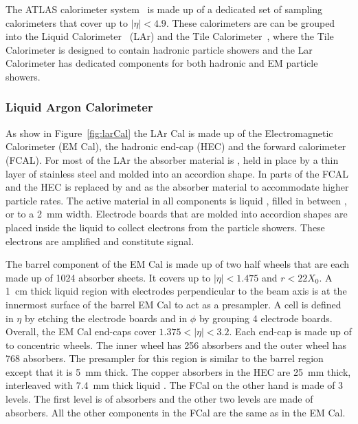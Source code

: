 \par The ATLAS calorimeter system~\cite{Puzo2002340} is made up of a dedicated set of sampling calorimeters that cover 
up to $|\eta|<4.9$. These calorimeters are can be grouped into the Liquid 
 Calorimeter~\cite{LARG-2009-01} (LAr) and the Tile Calorimeter~\cite{TCAL-2010-01},
 where the Tile Calorimeter is designed to contain hadronic particle
 showers and the Lar Calorimeter has dedicated components 
for both hadronic and EM particle showers. 
%
%
\subsubsection{Liquid Argon Calorimeter}
\par As show in Figure~\ref{fig:larCal} the LAr Cal is made up of the Electromagnetic Calorimeter (EM Cal), the 
hadronic end-cap (HEC) and the forward calorimeter (FCAL). For most of the LAr the
 absorber material is , held in place by a thin layer of stainless steel and molded into 
an accordion shape. In parts of the FCAL and the HEC  is replaced by 
 and  as the absorber material to accommodate higher particle rates. 
The active material in all components is liquid , filled in 
between ,  or  to a \SI{2}{\mm} width. Electrode boards that are molded 
into accordion shapes are placed inside the liquid  to collect electrons 
from the particle showers. These electrons are amplified and constitute signal.
 
\par The barrel component of the EM Cal is made up of two half wheels that are each made up of 1024 absorber sheets.
It covers up to $|\eta|<1.475$ and $r<22 X_0$. A \SI{1}{\cm} thick liquid  region with 
electrodes perpendicular to the beam axis is at the innermost surface of the barrel EM Cal to 
act as a presampler. A cell is defined in $\eta$ by etching the electrode boards and in $\phi$ by 
grouping 4 electrode boards. Overall, the EM Cal end-caps cover $1.375<|\eta|<3.2$. 
Each end-cap is made up of to concentric wheels. The inner wheel has 256 absorbers and 
the outer wheel has 768 absorbers. The presampler for this region 
is similar to the barrel region except that it is \SI{5}{\mm} thick. The copper absorbers in the 
HEC are \SI{25}{\mm} thick, interleaved with \SI{7.4}{mm} thick liquid . 
The FCal on the other hand is made of 3 levels. The first 
level is of  absorbers and the other two levels are made of  absorbers.  
All the other components in the FCal are the same as in the EM Cal.

